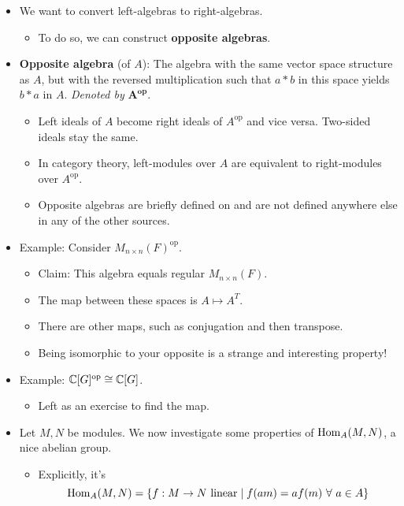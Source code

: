 \documentclass[../notes.tex]{subfiles}
\begin{document}
\begin{itemize}
    \item We want to convert left-algebras to right-algebras.
    \begin{itemize}
        \item To do so, we can construct \textbf{opposite algebras}.
    \end{itemize}
    \item \textbf{Opposite algebra} (of $A$): The algebra with the same vector space structure as $A$, but with the reversed multiplication such that $a*b$ in this space yields $b*a$ in $A$. \emph{Denoted by} $\bm{A^\textbf{op}}$.
    \begin{itemize}
        \item Left ideals of $A$ become right ideals of $A^\text{op}$ and vice versa. Two-sided ideals stay the same. 
        \item In category theory, left-modules over $A$ are equivalent to right-modules over $A^\text{op}$.
        \item Opposite algebras are briefly defined on \textcite[308]{bib:FultonHarris} and are not defined anywhere else in any of the other sources.
    \end{itemize}
    \item Example: Consider $M_{n\times n}(F)^\text{op}$.
    \begin{itemize}
        \item Claim: This algebra equals regular $M_{n\times n}(F)$.
        \item The map between these spaces is $A\mapsto A^T$.
        \item There are other maps, such as conjugation and then transpose.
        \item Being isomorphic to your opposite is a strange and interesting property!
    \end{itemize}
    \item Example: $\mathbb{C}[G]^\text{op}\cong\mathbb{C}[G]$.
    \begin{itemize}
        \item Left as an exercise to find the map.
    \end{itemize}
    \item Let $M,N$ be modules. We now investigate some properties of $\operatorname{Hom}_A(M,N)$, a nice abelian group.
    \begin{itemize}
        \item Explicitly, it's
        \begin{equation*}
            \Hom_A(M,N) = \{f:M\to N\text{ linear}\mid f(am)=af(m)\ \forall\ a\in A\}

\end{equation*}
\end{itemize}
\end{itemize}
\end{document}
